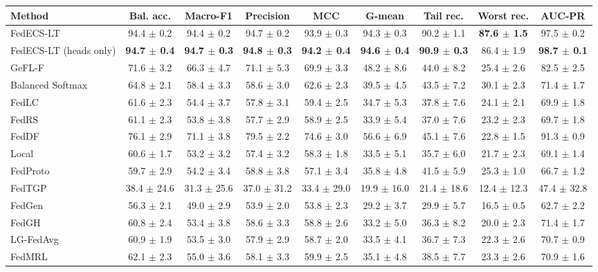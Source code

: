 \begin{tabular}{lcccccccc}
\toprule
Method & Bal. acc. & Macro-F1 & Precision & MCC & G-mean & Tail rec. & Worst rec. & AUC-PR\\
\midrule
FedECS-LT & 94.4 $\pm$ 0.2 & 94.4 $\pm$ 0.2 & 94.7 $\pm$ 0.2 & 93.9 $\pm$ 0.3 & 94.3 $\pm$ 0.3 & 90.2 $\pm$ 1.1 & \textbf{87.6 $\pm$ 1.5} & 97.5 $\pm$ 0.2\\
FedECS-LT (heads only) & \textbf{94.7 $\pm$ 0.4} & \textbf{94.7 $\pm$ 0.3} & \textbf{94.8 $\pm$ 0.3} & \textbf{94.2 $\pm$ 0.4} & \textbf{94.6 $\pm$ 0.4} & \textbf{90.9 $\pm$ 0.3} & 86.4 $\pm$ 1.9 & \textbf{98.7 $\pm$ 0.1}\\
GeFL-F & 71.6 $\pm$ 3.2 & 66.3 $\pm$ 4.7 & 71.1 $\pm$ 5.3 & 69.9 $\pm$ 3.3 & 48.2 $\pm$ 8.6 & 44.0 $\pm$ 8.2 & 25.4 $\pm$ 2.6 & 82.5 $\pm$ 2.5\\
Balanced Softmax & 64.8 $\pm$ 2.1 & 58.4 $\pm$ 3.3 & 58.6 $\pm$ 3.0 & 62.6 $\pm$ 2.3 & 39.5 $\pm$ 4.5 & 43.5 $\pm$ 7.2 & 30.1 $\pm$ 2.3 & 71.4 $\pm$ 1.7\\
FedLC & 61.6 $\pm$ 2.3 & 54.4 $\pm$ 3.7 & 57.8 $\pm$ 3.1 & 59.4 $\pm$ 2.5 & 34.7 $\pm$ 5.3 & 37.8 $\pm$ 7.6 & 24.1 $\pm$ 2.1 & 69.9 $\pm$ 1.8\\
FedRS & 61.1 $\pm$ 2.3 & 53.8 $\pm$ 3.8 & 57.7 $\pm$ 2.9 & 58.9 $\pm$ 2.5 & 33.9 $\pm$ 5.4 & 37.0 $\pm$ 7.6 & 23.2 $\pm$ 2.3 & 69.7 $\pm$ 1.8\\
FedDF & 76.1 $\pm$ 2.9 & 71.1 $\pm$ 3.8 & 79.5 $\pm$ 2.2 & 74.6 $\pm$ 3.0 & 56.6 $\pm$ 6.9 & 45.1 $\pm$ 7.6 & 22.8 $\pm$ 1.5 & 91.3 $\pm$ 0.9\\
Local & 60.6 $\pm$ 1.7 & 53.2 $\pm$ 3.2 & 57.4 $\pm$ 3.2 & 58.3 $\pm$ 1.8 & 33.5 $\pm$ 5.1 & 35.7 $\pm$ 6.0 & 21.7 $\pm$ 2.3 & 69.1 $\pm$ 1.4\\
FedProto & 59.7 $\pm$ 2.9 & 54.2 $\pm$ 3.4 & 58.8 $\pm$ 3.8 & 57.1 $\pm$ 3.4 & 35.8 $\pm$ 4.8 & 41.5 $\pm$ 5.9 & 25.3 $\pm$ 1.0 & 66.7 $\pm$ 1.2\\
FedTGP & 38.4 $\pm$ 24.6 & 31.3 $\pm$ 25.6 & 37.0 $\pm$ 31.2 & 33.4 $\pm$ 29.0 & 19.9 $\pm$ 16.0 & 21.4 $\pm$ 18.6 & 12.4 $\pm$ 12.3 & 47.4 $\pm$ 32.8\\
FedGen & 56.3 $\pm$ 2.1 & 49.0 $\pm$ 2.9 & 53.9 $\pm$ 2.0 & 53.8 $\pm$ 2.3 & 29.2 $\pm$ 3.7 & 29.9 $\pm$ 5.7 & 16.5 $\pm$ 0.5 & 62.7 $\pm$ 2.2\\
FedGH & 60.8 $\pm$ 2.4 & 53.4 $\pm$ 3.8 & 58.6 $\pm$ 3.3 & 58.8 $\pm$ 2.6 & 33.2 $\pm$ 5.0 & 36.3 $\pm$ 8.2 & 20.0 $\pm$ 2.3 & 71.4 $\pm$ 1.7\\
LG-FedAvg & 60.9 $\pm$ 1.9 & 53.5 $\pm$ 3.0 & 57.9 $\pm$ 2.9 & 58.7 $\pm$ 2.0 & 33.5 $\pm$ 4.1 & 36.7 $\pm$ 7.3 & 22.3 $\pm$ 2.6 & 70.7 $\pm$ 0.9\\
FedMRL & 62.1 $\pm$ 2.3 & 55.0 $\pm$ 3.6 & 58.1 $\pm$ 3.3 & 59.9 $\pm$ 2.5 & 35.1 $\pm$ 4.8 & 38.5 $\pm$ 7.7 & 23.3 $\pm$ 2.6 & 70.9 $\pm$ 1.6\\
\bottomrule
\end{tabular}
